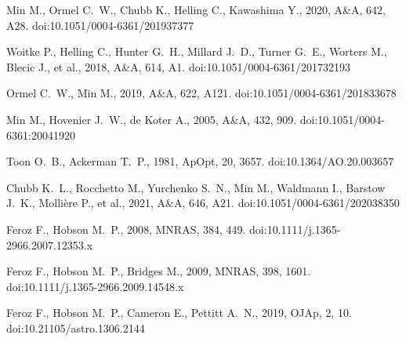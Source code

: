 \documentclass[12pt]{article}
\begin{document}
\begin{thebibliography}{91}

 Min M., Ormel C.~W., Chubb K., Helling C., Kawashima Y., 2020, A\&A, 642, A28. doi:10.1051/0004-6361/201937377

 Woitke P., Helling C., Hunter G.~H., Millard J.~D., Turner G.~E., Worters M., Blecic J., et al., 2018, A\&A, 614, A1. doi:10.1051/0004-6361/201732193

 Ormel C.~W., Min M., 2019, A\&A, 622, A121. doi:10.1051/0004-6361/201833678

 Min M., Hovenier J.~W., de Koter A., 2005, A\&A, 432, 909. doi:10.1051/0004-6361:20041920

 Toon O.~B., Ackerman T.~P., 1981, ApOpt, 20, 3657. doi:10.1364/AO.20.003657

 Chubb K.~L., Rocchetto M., Yurchenko S.~N., Min M., Waldmann I., Barstow J.~K., Molli{\`e}re P., et al., 2021, A\&A, 646, A21. doi:10.1051/0004-6361/202038350

 Feroz F., Hobson M.~P., 2008, MNRAS, 384, 449. doi:10.1111/j.1365-2966.2007.12353.x

 Feroz F., Hobson M.~P., Bridges M., 2009, MNRAS, 398, 1601. doi:10.1111/j.1365-2966.2009.14548.x

 Feroz F., Hobson M.~P., Cameron E., Pettitt A.~N., 2019, OJAp, 2, 10. doi:10.21105/astro.1306.2144

\end{thebibliography}
\end{document}
